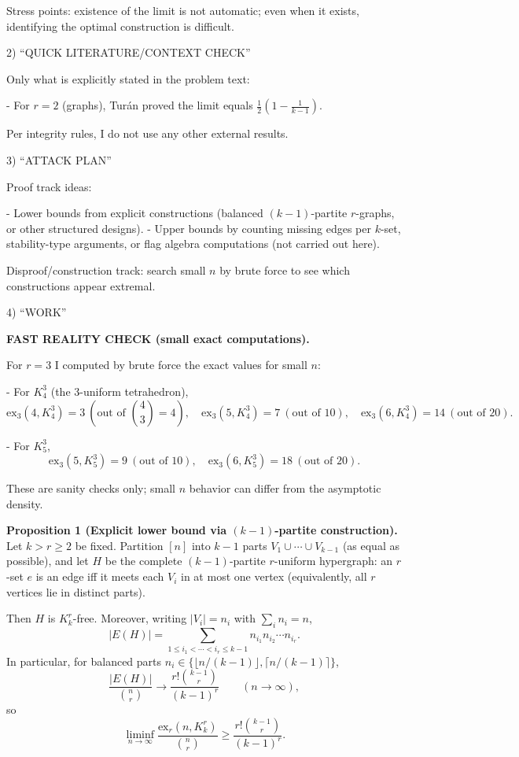 Stress points: existence of the limit is not automatic; even when it exists, identifying the optimal construction is difficult.

2) “QUICK LITERATURE/CONTEXT CHECK”

Only what is explicitly stated in the problem text:

- For $r=2$ (graphs), Tur\'{a}n proved the limit equals $\frac12\left(1-\frac1{k-1}\right)$.

Per integrity rules, I do not use any other external results.

3) “ATTACK PLAN”

Proof track ideas:

- Lower bounds from explicit constructions (balanced $(k-1)$-partite $r$-graphs, or other structured designs).
- Upper bounds by counting missing edges per $k$-set, stability-type arguments, or flag algebra computations (not carried out here).

Disproof/construction track: search small $n$ by brute force to see which constructions appear extremal.

4) “WORK”

\textbf{FAST REALITY CHECK (small exact computations).}

For $r=3$ I computed by brute force the exact values for small $n$:

- For $K_4^3$ (the 3-uniform tetrahedron),
\[
\mathrm{ex}_3(4,K_4^3)=3\ (\text{out of }\binom43=4),\quad
\mathrm{ex}_3(5,K_4^3)=7\ (\text{out of }10),\quad
\mathrm{ex}_3(6,K_4^3)=14\ (\text{out of }20).
\]

- For $K_5^3$,
\[
\mathrm{ex}_3(5,K_5^3)=9\ (\text{out of }10),\quad
\mathrm{ex}_3(6,K_5^3)=18\ (\text{out of }20).
\]

These are sanity checks only; small $n$ behavior can differ from the asymptotic density.

\medskip
\textbf{Proposition 1 (Explicit lower bound via $(k-1)$-partite construction).}
Let $k>r\ge 2$ be fixed. Partition $[n]$ into $k-1$ parts $V_1\cup\cdots\cup V_{k-1}$ (as equal as possible), and let $H$ be the complete $(k-1)$-partite $r$-uniform hypergraph: an $r$-set $e$ is an edge iff it meets each $V_i$ in at most one vertex (equivalently, all $r$ vertices lie in distinct parts).

Then $H$ is $K_k^r$-free. Moreover, writing $|V_i|=n_i$ with $\sum_i n_i=n$,
\[
|E(H)|=\sum_{1\le i_1<\cdots<i_r\le k-1} n_{i_1}n_{i_2}\cdots n_{i_r}.
\]
In particular, for balanced parts $n_i\in\{\lfloor n/(k-1)\rfloor,\lceil n/(k-1)\rceil\}$,
\[
\frac{|E(H)|}{\binom{n}{r}} \to \frac{r!\binom{k-1}{r}}{(k-1)^r}
\qquad (n\to\infty),
\]
so
\[
\liminf_{n\to\infty}\frac{\mathrm{ex}_r(n,K_k^r)}{\binom{n}{r}}\ge \frac{r!\binom{k-1}{r}}{(k-1)^r}.
\]

